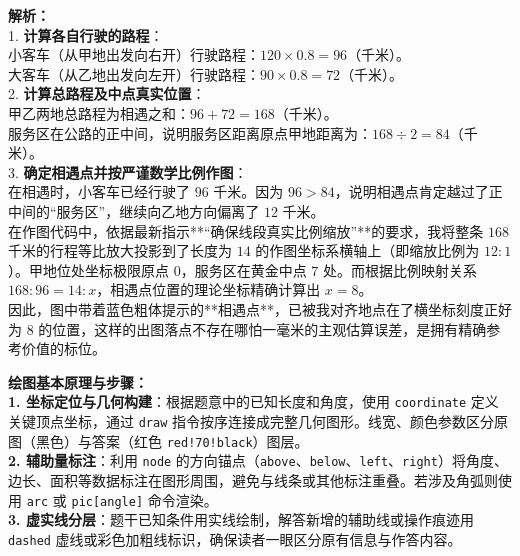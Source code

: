 \vspace{0.6cm}
{\small\color{gray}
\textbf{解析：}\\
1. \textbf{计算各自行驶的路程}：\\
\indent 小客车（从甲地出发向右开）行驶路程：$120 \times 0.8 = 96$（千米）。\\
\indent 大客车（从乙地出发向左开）行驶路程：$90 \times 0.8 = 72$（千米）。\\
2. \textbf{计算总路程及中点真实位置}：\\
\indent 甲乙两地总路程为相遇之和：$96 + 72 = 168$（千米）。\\
\indent 服务区在公路的正中间，说明服务区距离原点甲地距离为：$168 \div 2 = 84$（千米）。\\
3. \textbf{确定相遇点并按严谨数学比例作图}：\\
\indent 在相遇时，小客车已经行驶了 $96$ 千米。因为 $96 > 84$，说明相遇点肯定越过了正中间的“服务区”，继续向乙地方向偏离了 $12$ 千米。\\
\indent 在作图代码中，依据最新指示**“确保线段真实比例缩放”**的要求，我将整条 $168$ 千米的行程等比放大投影到了长度为 $14$ 的作图坐标系横轴上（即缩放比例为 $12:1$）。甲地位处坐标极限原点 $0$，服务区在黄金中点 $7$ 处。而根据比例映射关系 $168 : 96 = 14 : x$，相遇点位置的理论坐标精确计算出 $x = 8$。\\
\indent 因此，图中带着蓝色粗体提示的**相遇点**，已被我对齐地点在了横坐标刻度正好为 $8$ 的位置，这样的出图落点不存在哪怕一毫米的主观估算误差，是拥有精确参考价值的标位。
}


\vspace{0.6cm}

{\small\color{blue!70!black}
\textbf{绘图基本原理与步骤：}\\
\textbf{1. 坐标定位与几何构建}：根据题意中的已知长度和角度，使用 \texttt{coordinate} 定义关键顶点坐标，通过 \texttt{draw} 指令按序连接成完整几何图形。线宽、颜色参数区分原图（黑色）与答案（红色 \texttt{red!70!black}）图层。\\
\textbf{2. 辅助量标注}：利用 \texttt{node} 的方向锚点（\texttt{above}、\texttt{below}、\texttt{left}、\texttt{right}）将角度、边长、面积等数据标注在图形周围，避免与线条或其他标注重叠。若涉及角弧则使用 \texttt{arc} 或 \texttt{pic[angle]} 命令渲染。\\
\textbf{3. 虚实线分层}：题干已知条件用实线绘制，解答新增的辅助线或操作痕迹用 \texttt{dashed} 虚线或彩色加粗线标识，确保读者一眼区分原有信息与作答内容。
}




